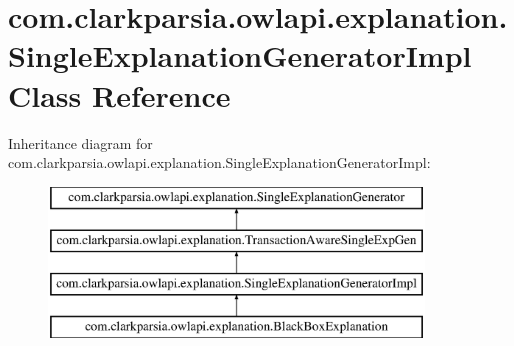 \hypertarget{classcom_1_1clarkparsia_1_1owlapi_1_1explanation_1_1_single_explanation_generator_impl}{\section{com.\-clarkparsia.\-owlapi.\-explanation.\-Single\-Explanation\-Generator\-Impl Class Reference}
\label{classcom_1_1clarkparsia_1_1owlapi_1_1explanation_1_1_single_explanation_generator_impl}
}
Inheritance diagram for com.\-clarkparsia.\-owlapi.\-explanation.\-Single\-Explanation\-Generator\-Impl\-:\begin{figure}[H]
\begin{center}
\leavevmode
\includegraphics[height=4.000000cm]{classcom_1_1clarkparsia_1_1owlapi_1_1explanation_1_1_single_explanation_generator_impl}
\end{center}
\end{figure}
